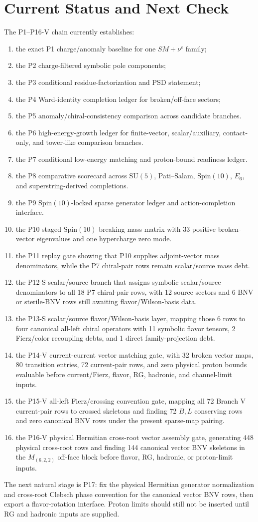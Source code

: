 \documentclass[11pt]{article}
\newcommand{\SU}{\mathrm{SU}}
\newcommand{\Spin}{\mathrm{Spin}}
\newcommand{\nuc}{\nu^c}
\begin{document}
\section{Current Status and Next Check}

The P1--P16-V chain currently establishes:
\begin{enumerate}
\item the exact P1 charge/anomaly baseline for one $SM+\nuc$ family;
\item the P2 charge-filtered symbolic pole components;
\item the P3 conditional residue-factorization and PSD statement;
\item the P4 Ward-identity completion ledger for broken/off-face sectors;
\item the P5 anomaly/chiral-consistency comparison across candidate branches.
\item the P6 high-energy-growth ledger for finite-vector, scalar/auxiliary,
contact-only, and tower-like comparison branches.
\item the P7 conditional low-energy matching and proton-bound readiness
ledger.
\item the P8 comparative scorecard across $\SU(5)$, Pati--Salam, $\Spin(10)$,
$E_6$, and superstring-derived completions.
\item the P9 $\Spin(10)$-locked sparse generator ledger and action-completion
interface.
\item the P10 staged $\Spin(10)$ breaking mass matrix with $33$ positive
broken-vector eigenvalues and one hypercharge zero mode.
\item the P11 replay gate showing that P10 supplies adjoint-vector mass
denominators, while the P7 chiral-pair rows remain scalar/source mass debt.
\item the P12-S scalar/source branch that assigns symbolic scalar/source
denominators to all 18 P7 chiral-pair rows, with 12 source sectors and 6 BNV
or sterile-BNV rows still awaiting flavor/Wilson-basis data.
\item the P13-S scalar/source flavor/Wilson-basis layer, mapping those 6 rows
to four canonical all-left chiral operators with 11 symbolic flavor tensors,
2 Fierz/color recoupling debts, and 1 direct family-projection debt.
\item the P14-V current-current vector matching gate, with 32 broken vector
maps, 80 transition entries, 72 current-pair rows, and zero physical proton
bounds evaluable before current/Fierz, flavor, RG, hadronic, and channel-limit
inputs.
\item the P15-V all-left Fierz/crossing convention gate, mapping all 72 Branch
V current-pair rows to crossed skeletons and finding 72 $B,L$ conserving rows
and zero canonical BNV rows under the present sparse-map pairing.
\item the P16-V physical Hermitian cross-root vector assembly gate, generating
448 physical cross-root rows and finding 144 canonical vector BNV skeletons in
the $M_{(6,2,2)}$ off-face block before flavor, RG, hadronic, or proton-limit
inputs.
\end{enumerate}
The next natural stage is P17: fix the physical Hermitian generator
normalization and cross-root Clebsch phase convention for the canonical vector
BNV rows, then export a flavor-rotation interface.  Proton limits should still
not be inserted until RG and hadronic inputs are supplied.
\end{document}
